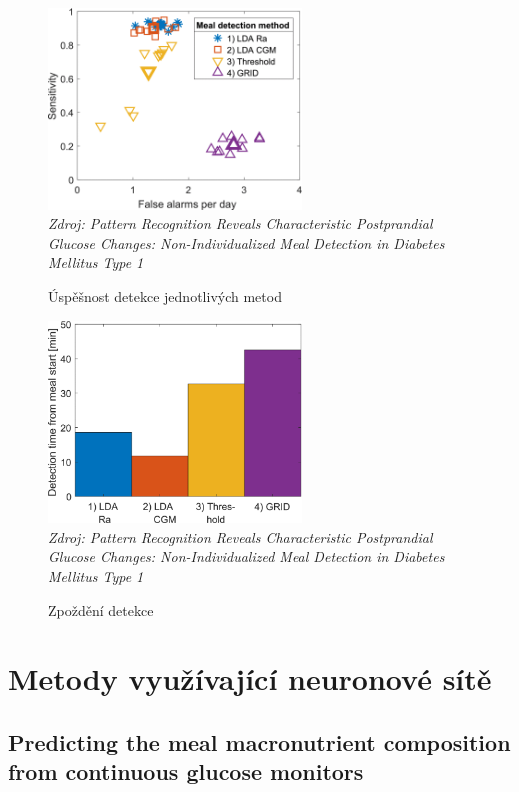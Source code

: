 \begin{figure}[H]
\caption{Úspěšnost detekce jednotlivých metod}
\label{fig:analyza:lda1}
\centering
\includegraphics[width=0.6\textwidth]{img/analyzaCHO/lda1.png}\\
\textit{Zdroj: Pattern Recognition Reveals Characteristic Postprandial Glucose Changes: Non-Individualized Meal Detection in Diabetes Mellitus Type 1 \citep{analyzaCHO.LDA}}
\end{figure}
\begin{figure}[H]
\caption{Zpoždění detekce}
\label{fig:analyza:lda2}
\centering
\includegraphics[width=0.6\textwidth]{img/analyzaCHO/lda2.png}\\
\textit{Zdroj: Pattern Recognition Reveals Characteristic Postprandial Glucose Changes: Non-Individualized Meal Detection in Diabetes Mellitus Type 1 \citep{analyzaCHO.LDA}}
\end{figure}


\section{Metody využívající neuronové sítě}
\subsection{Predicting the meal macronutrient composition from continuous glucose monitors}
\label{ch:analyzaCHO:neuronka}

